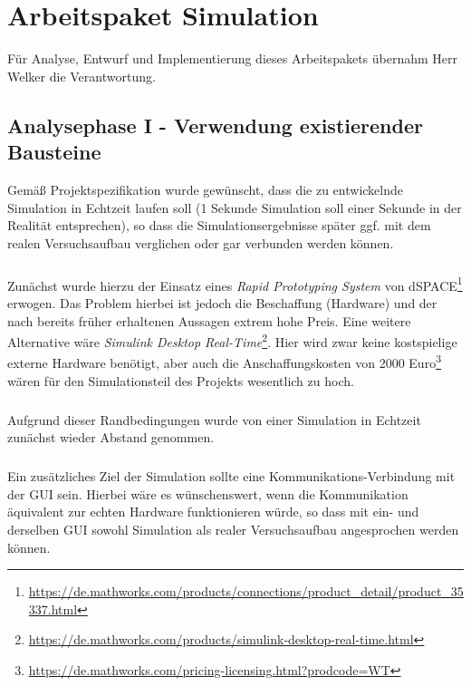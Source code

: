 

\chapter{Arbeitspaket Simulation}
Für Analyse, Entwurf und Implementierung dieses Arbeitspakets übernahm Herr Welker die Verantwortung.

\section{Analysephase I - Verwendung existierender Bausteine}
Gemäß Projektspezifikation wurde gewünscht, dass die zu entwickelnde Simulation in Echtzeit laufen soll (1 Sekunde Simulation soll einer Sekunde in der Realität entsprechen), so dass die Simulationsergebnisse später ggf. mit dem realen Versuchsaufbau verglichen oder gar verbunden werden können. 

\paragraph{}
Zunächst wurde hierzu der Einsatz eines \textit{Rapid Prototyping System} von dSPACE\footnote{\url{https://de.mathworks.com/products/connections/product_detail/product_35337.html}} erwogen.
Das Problem hierbei ist jedoch die Beschaffung (Hardware) und der nach bereits früher erhaltenen Aussagen extrem hohe Preis. 
Eine weitere Alternative wäre \textit{Simulink Desktop Real-Time}\footnote{\url{https://de.mathworks.com/products/simulink-desktop-real-time.html}}.
Hier wird zwar keine kostspielige externe Hardware benötigt, aber auch die Anschaffungskosten von 2000 Euro\footnote{\url{https://de.mathworks.com/pricing-licensing.html?prodcode=WT}}
wären für den Simulationsteil des Projekts wesentlich zu hoch. 

\paragraph{}
Aufgrund dieser Randbedingungen wurde von einer Simulation in Echtzeit zunächst wieder Abstand genommen.

\paragraph{}
Ein zusätzliches Ziel der Simulation sollte eine Kommunikations-Verbindung mit der GUI sein. Hierbei wäre es wünschenswert, wenn die Kommunikation äquivalent zur echten Hardware funktionieren würde, so dass mit ein- und derselben GUI sowohl Simulation als realer Versuchsaufbau angesprochen werden können. 

